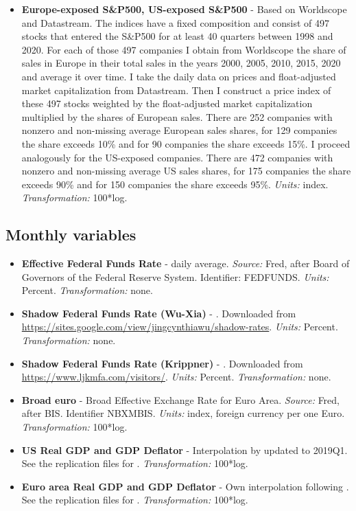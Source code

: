 \documentclass[a4paper,12pt]{article}
\begin{document}
\begin{itemize}
\item
\textbf{Europe-exposed S\&P500, US-exposed S\&P500} - Based on Worldscope and Datastream.
The indices have a fixed composition and consist of 497 stocks that entered the S\&P500 for at least 40 quarters between 1998 and 2020.
For each of those 497 companies I obtain from Worldscope the share of sales in Europe in their total sales in the years 2000, 2005, 2010, 2015, 2020 and average it over time.
I take the daily data on prices and float-adjusted market capitalization from Datastream.
Then I construct a price index of these 497 stocks weighted by the float-adjusted market capitalization multiplied by the shares of European sales.
There are 252 companies with nonzero and non-missing average European sales shares, for 129 companies the share exceeds 10\% and for 90 companies the share exceeds 15\%.
I proceed analogously for the US-exposed companies.
There are 472 companies with nonzero and non-missing average US sales shares, for 175 companies the share exceeds 90\% and for 150 companies the share exceeds 95\%.
\emph{Units:} index. \emph{Transformation:} 100*log.
\end{itemize}

\subsection{Monthly variables}

\begin{itemize}
\item
\textbf{Effective Federal Funds Rate} - daily average. \emph{Source:} Fred, after Board of Governors of the Federal Reserve System. Identifier: FEDFUNDS. \emph{Units:} Percent. \emph{Transformation:} none.
\item
\textbf{Shadow Federal Funds Rate (Wu-Xia)} - \cite{Wu_Xia_2016}. Downloaded
from \url{https://sites.google.com/view/jingcynthiawu/shadow-rates}.
\emph{Units:} Percent. \emph{Transformation:} none.
\item 
\textbf{Shadow Federal Funds Rate (Krippner)} - \cite{Krippner_2013,Krippner_2015}. Downloaded
from \url{https://www.ljkmfa.com/visitors/}.
\emph{Units:} Percent. \emph{Transformation:} none.
\item
\textbf{Broad euro} - Broad Effective Exchange Rate for Euro Area. \emph{Source:} Fred, after BIS.  Identifier NBXMBIS. \emph{Units:} index, foreign currency per one Euro. \emph{Transformation:} 100*log.
\item
\textbf{US Real GDP and GDP Deflator} - Interpolation by
\cite{Stock_Watson_2010} updated to 2019Q1. See the replication files for \cite{Jarocinski_Karadi_2020}. \emph{Transformation:} 100*log.
\item
\textbf{Euro area Real GDP and GDP Deflator} - Own interpolation following
\cite{Stock_Watson_2010}. See the replication files for \cite{Jarocinski_Karadi_2020}. \emph{Transformation:} 100*log.
\end{itemize}
\end{document}
